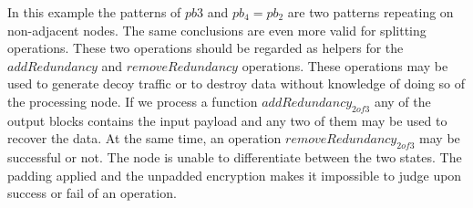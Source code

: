 \documentclass[10pt,journal,compsoc,twocolumn,twoside]{IEEEtran}
\begin{document}
%
In this example the patterns of $pb3$ and $pb_4=pb_2$ are two patterns repeating on non-adjacent nodes. The same conclusions are even more valid for splitting operations. These two operations should be regarded as helpers for the $addRedundancy$ and $removeRedundancy$ operations. These operations may be used to generate decoy traffic or to destroy data without knowledge of doing so of the processing node. If we process a function $addRedundancy_{2 of 3}$ any of the output blocks contains the input payload and any two of them may be used to recover the data. At the same time, an operation $removeRedundancy_{2 of 3}$ may be successful or not. The node is unable to differentiate between the two states. The padding applied and the unpadded encryption makes it impossible to judge upon success or fail of an operation.
\end{document}
